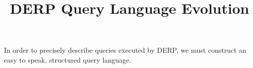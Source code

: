 \documentclass{article}
\title{DERP Query Language Evolution}
\begin{document}
\maketitle
In order to precisely describe queries executed by DERP, we must construct an easy to speak, structured query language. 
\end{document}
